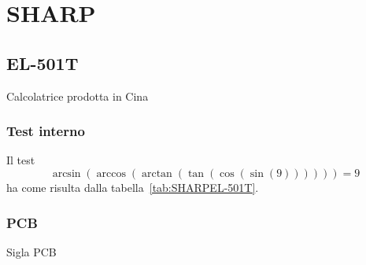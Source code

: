 \chapter{SHARP}
\section{EL-501T}
Calcolatrice prodotta in Cina
\subsection{Test interno}
Il test\[\arcsin(\arccos(\arctan(\tan(\cos(\sin(9))))))=9\] ha come risulta dalla tabella~\vref{tab:SHARPEL-501T}. 
\subsection{PCB}
Sigla PCB
%	
%	
